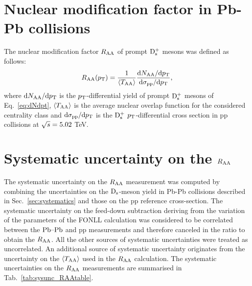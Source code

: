 \section{Nuclear modification factor in Pb-Pb collisions}
\label{sec:RAA}
The nuclear modification factor $R_{\rm AA}$ of prompt ${\rm D_s^+}$ mesons was defined as follows:
\begin{equation}
\label{eq:RAADs}
R_{\rm AA} (p_{\rm T}) = \frac{1}{\langle T_{\rm AA} \rangle} \frac{{\rm d} N_{\rm AA}/{\rm d}p_{\rm T}}{{\rm d} \sigma_{\rm pp}/{\rm d} p_{\rm T}},
\end{equation}
where ${\rm d} N_{\rm AA}/{\rm d}p_{\rm T}$ is the $p_{\rm T}$-differential yield of prompt ${\rm D_s^+}$ mesons
of Eq.~\ref{eq:dNdpt}, $\langle T_{\rm AA} \rangle$ is the 
average nuclear overlap function for the considered centrality class and ${\rm d} \sigma_{\rm pp}/{\rm d} p_{\rm T}$ is 
the ${\rm D_s^+}$ $p_{\rm T}$-differential cross section in pp collisions at $\sqrt{s} = 5.02$ TeV.
\section{Systematic uncertainty on the $R_{\rm AA}$}
\label{sec:SystRAA}
The systematic uncertainty on the $R_{\rm AA}$ measurement was computed by combining the uncertainties  
on the ${\rm D_s}$-meson yield in Pb-Pb collisions described in Sec.~\ref{sec:systematics} and those 
on the pp reference cross-section. The systematic 
uncertainty on the feed-down subtraction deriving from
the variation of the parameters of the FONLL calculation was considered to be
correlated between the $\mbox{Pb--Pb}$ and pp measurements and therefore canceled in the ratio
to obtain the $R_{\rm AA}$. All the 
other sources of systematic uncertainties were treated as uncorrelated. 
An additional source of systematic uncertainty originates from the uncertainty
on the $\langle T_{\rm AA}\rangle$ used in the $R_{\rm AA}$ calculation.
The systematic uncertainties on the $R_{\rm AA}$ measurements are summarised in Tab.~\ref{tab:sysunc_RAAtable}.


